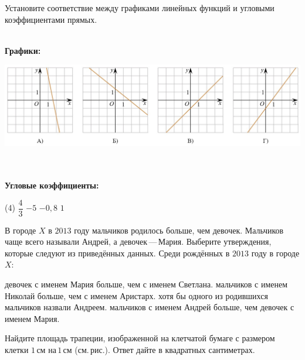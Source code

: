 \begin{class}[number=6]
\begin{listofex}
\begin{minipage}[t]{\linewidth}
		\end{minipage}
		\item 
		\begin{minipage}[t]{\linewidth}
			Установите соответствие между графиками линейных функций и угловыми коэффициентами прямых.
		\end{minipage}
		\hspace{0.02\linewidth}
		\\
		\textbf{Графики:}
		\\
		\begin{minipage}[t]{\linewidth}
			\includegraphics[align=t, width=\linewidth]{../pics/G101M8L6-3}
		\end{minipage}
		\\
		\\
		\textbf{Угловые коэффициенты:}
		\begin{tasks}(4)
			\task \( \dfrac{ 4 }{ 3 } \)
			\task \( -5 \)
			\task \( -0,8 \)
			\task \( 1 \)
		\end{tasks}
		\item В городе \(X\) в \(2013\) году мальчиков родилось больше, чем девочек. Мальчиков чаще всего называли Андрей, а девочек --- Мария. Выберите утверждения, которые следуют из приведённых данных. Среди рождённых в \(2013\) году в городе \(X\):
		\begin{tasks}
			\task девочек с именем Мария больше, чем с именем Светлана.
			\task мальчиков с именем Николай больше, чем с именем Аристарх.
			\task хотя бы одного из родившихся мальчиков назвали Андреем.
			\task мальчиков с именем Андрей больше, чем девочек с именем Мария.
		\end{tasks}
		\item
		\begin{minipage}[t]{0.68\linewidth}
			Найдите площадь трапеции, изображенной на клетчатой бумаге с размером клетки \(1\) см на \(1\) см (см. рис.). Ответ дайте в квадратных сантиметрах.
		\end{minipage}
		\hspace{0.02\linewidth}
		\begin{minipage}[t]{0.27\linewidth}

\end{minipage}
\end{listofex}
\end{class}
